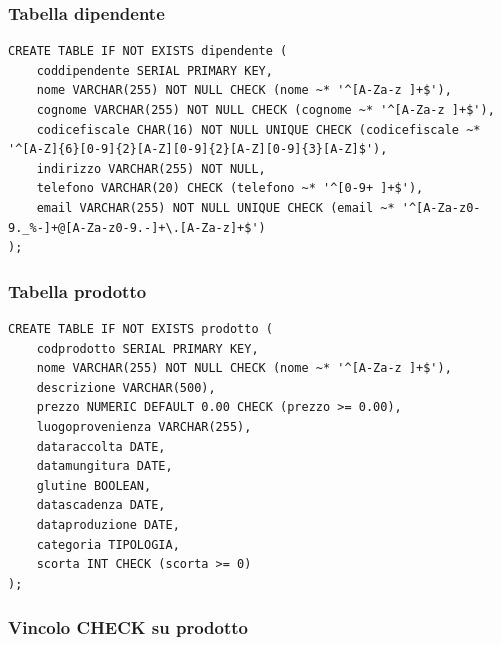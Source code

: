 \documentclass[a4paper,12pt]{article}
\begin{document}
\subsubsection*{Tabella dipendente}

\vspace{1.5em}
\begin{lstlisting}[style=sqlstyle]
CREATE TABLE IF NOT EXISTS dipendente (
    coddipendente SERIAL PRIMARY KEY,
    nome VARCHAR(255) NOT NULL CHECK (nome ~* '^[A-Za-z ]+$'),
    cognome VARCHAR(255) NOT NULL CHECK (cognome ~* '^[A-Za-z ]+$'),
    codicefiscale CHAR(16) NOT NULL UNIQUE CHECK (codicefiscale ~* '^[A-Z]{6}[0-9]{2}[A-Z][0-9]{2}[A-Z][0-9]{3}[A-Z]$'),
    indirizzo VARCHAR(255) NOT NULL,
    telefono VARCHAR(20) CHECK (telefono ~* '^[0-9+ ]+$'),
    email VARCHAR(255) NOT NULL UNIQUE CHECK (email ~* '^[A-Za-z0-9._%-]+@[A-Za-z0-9.-]+\.[A-Za-z]+$')
);
\end{lstlisting}
\vspace{1.5em}
\subsubsection*{Tabella prodotto}

\vspace{1.5em}
\begin{lstlisting}[style=sqlstyle]
CREATE TABLE IF NOT EXISTS prodotto (
    codprodotto SERIAL PRIMARY KEY,
    nome VARCHAR(255) NOT NULL CHECK (nome ~* '^[A-Za-z ]+$'),
    descrizione VARCHAR(500),
    prezzo NUMERIC DEFAULT 0.00 CHECK (prezzo >= 0.00),
    luogoprovenienza VARCHAR(255),
    dataraccolta DATE,
    datamungitura DATE,
    glutine BOOLEAN,
    datascadenza DATE,
    dataproduzione DATE,
    categoria TIPOLOGIA,
    scorta INT CHECK (scorta >= 0)
);
\end{lstlisting}
\vspace{1.5em}
\subsubsection*{Vincolo CHECK su prodotto}
\end{document}

